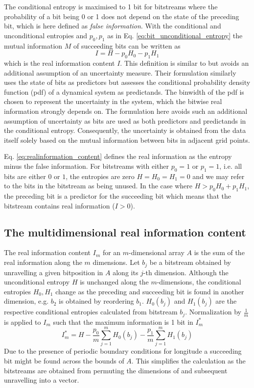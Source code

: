 The conditional entropy is maximised to 1 bit for bitstreams where the probability of a bit being 0 or 1 does not depend on the state of the
preceding bit, which is here defined as \emph{false information}. With the conditional and unconditional entropies and $p_0,p_1$ as in
Eq. \ref{eq:bit_unconditional_entropy} the mutual information $M$ of succeeding bits can be written as
	\begin{equation}
	I = H - p_0H_0 - p_1H_1
	\label{eq:realinformation_content}
	\end{equation}
which is the real information content $I$. This definition is similar to \cite{Jeffress2017} but avoids an additional assumption of an uncertainty
measure. Their formulation similarly uses the state of bits as predictors but assesses the conditional probability density function (pdf) of a
dynamical system as predictands. The binwidth of the pdf is chosen to represent the uncertainty in the system, which the bitwise real information
strongly depends on. The formulation here avoids such an additional assumption of uncertainty as bits are used as both predictors and
predictands in the conditional entropy. Consequently, the uncertainty is obtained from the data itself solely based on the mutual information
between bits in adjacent grid points.

Eq. \ref{eq:realinformation_content} defines the real information as the entropy minus the false information. For bitstreams with either $p_0 = 1$
or $p_1=1$, i.e. all bits are either $0$ or $1$, the entropies are zero $H = H_0 = H_1 = 0$ and we may refer to the bits in the bitstream as being unused.
In the case where $H > p_0H_0 + p_1H_1$, the preceding bit is a predictor for the succeeding bit which means that the bitstream contains
real information ($I > 0$).

\subsection{The multidimensional real information content}

The real information content $I_m$ for an $m$-dimensional array $A$ is the sum of the real information along the $m$ dimensions.
Let $b_j$ be a bitstream obtained by unravelling a given bitposition in $A$ along its $j$-th dimension. 
Although the unconditional entropy $H$ is unchanged along the $m$-dimensions, the conditional entropies $H_0,H_1$ change as the
preceding and succeeding bit is found in another dimension, e.g. $b_2$ is obtained by reordering $b_1$. $H_0(b_j)$ and $H_1(b_j)$
are the respective conditional entropies calculated from bitstream $b_j$. Normalization by $\tfrac{1}{m}$  is applied to $I_m$ such
that the maximum information is 1 bit in $I_m^*$
	\begin{equation}
	I_m^* = H - \frac{p_0}{m} \sum_{j=1}^mH_0(b_j) - \frac{p_1}{m}\sum_{j=1}^mH_1(b_j)
	\end{equation}
Due to the presence of periodic boundary conditions for longitude a succeeding bit might be found across the bounds of $A$.
This simplifies the calculation as the bitstreams are obtained from permuting the dimensions of  and subsequent unravelling into a vector.

